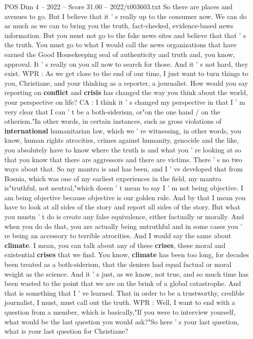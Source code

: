 \begin{textsample}{POS Dim 4 – 2022 – Score 31.00 – 2022/t003603.txt}
So there are places and avenues to go.
But I believe that it ' s really up to the consumer now.
We can do as much as we can to bring you the truth, fact-checked, evidence-based news information.
But you must not go to the fake news sites and believe that that ' s the truth.
You must go to what I would call the news organizations that have earned the Good Housekeeping seal of authenticity and truth and, you know, approval.
It ' s really on you all now to search for those.
And it ' s not hard, they exist.
WPR : As we get close to the end of our time, I just want to turn things to you, Christiane, and your thinking as a reporter, a journalist.
How would you say reporting on \textbf{conflict} and \textbf{crisis} has changed the way you think about the world, your perspective on life?
CA : I think it ' s changed my perspective in that I ' m very clear that I can ' t be a both-siderism, or"on the one hand / on the otherism."In other words, in certain instances, such as gross violations of \textbf{international} humanitarian law, which we ' re witnessing, in other words, you know, human rights atrocities, crimes against humanity, genocide and the like, you absolutely have to know where the truth is and what you ' re looking at so that you know that there are aggressors and there are victims.
There ' s no two ways about that.
So my mantra is and has been, and I ' ve developed that from Bosnia, which was one of my earliest experiences in the field, my mantra is"truthful, not neutral,"which doesn ' t mean to say I ' m not being objective.
I am being objective because objective is our golden rule.
And by that I mean you have to look at all sides of the story and report all sides of the story.
But what you mustn ' t do is create any false equivalence, either factually or morally.
And when you do do that, you are actually being untruthful and in some cases you ' re being an accessory to terrible atrocities.
And I would say the same about \textbf{climate}.
I mean, you can talk about any of these \textbf{crises}, these moral and existential \textbf{crises} that we find.
You know, \textbf{climate} has been too long, for decades been treated as a both-siderism, that the deniers had equal factual or moral weight as the science.
And it ' s just, as we know, not true, and so much time has been wasted to the point that we are on the brink of a global catastrophe.
And that is something that I ' ve learned.
That in order to be a trustworthy, credible journalist, I must, must call out the truth.
WPR : Well, I want to end with a question from a member, which is basically,"If you were to interview yourself, what would be the last question you would ask?"So here ' s your last question, what is your last question for Christiane?

\end{textsample}

